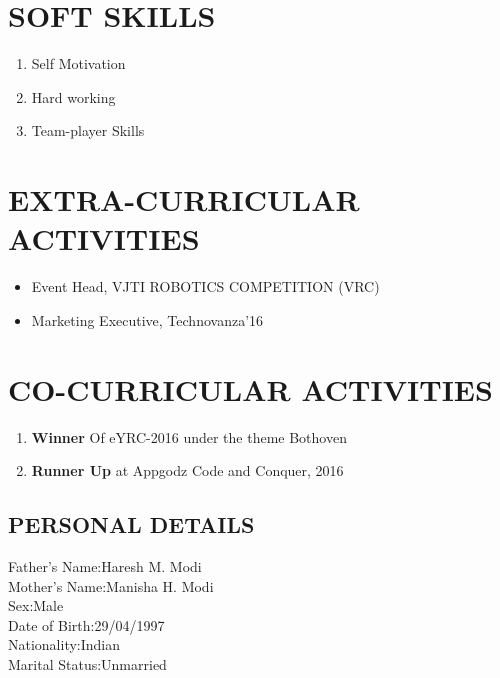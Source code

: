 \documentclass[11pt,a4paper,sans]{moderncv}
\begin{document}
	\section{SOFT SKILLS}
	\begin{enumerate}
		\item {Self Motivation}
		\item {Hard working}
		\item {Team-player Skills}
		
	\end{enumerate}
	\section{EXTRA-CURRICULAR ACTIVITIES}
	\begin{itemize}
		\item {Event Head, VJTI ROBOTICS COMPETITION (VRC)}
		\item {Marketing Executive, Technovanza'16}
	\end{itemize}
	\section{CO-CURRICULAR ACTIVITIES}
	\begin{enumerate}
		\item{\textbf{Winner} Of eYRC-2016 under the theme Bothoven}
		\item{\textbf{Runner Up} at Appgodz Code and Conquer, 2016}
	\end{enumerate}
	\begin{flushleft}
		\section{PERSONAL DETAILS}
		Father's Name:\hspace{0.1in}Haresh M. Modi\\	
		Mother's Name:\hspace{0.06in}Manisha H. Modi\\
		Sex:\hspace{0.78in}Male\\
		Date of Birth:\hspace{0.16in}29/04/1997\\
		Nationality:\hspace{0.3in}Indian\\
		Marital Status:\hspace{0.1in}Unmarried\\
	\end{flushleft}
	
\end{document}
